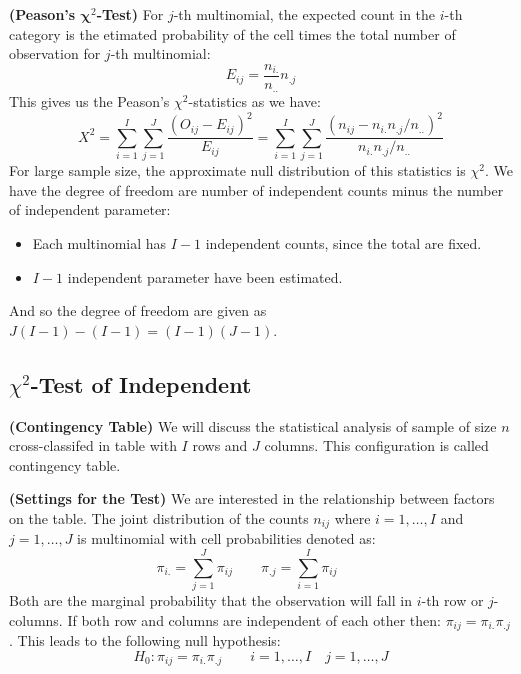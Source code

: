 \begin{definition}{\textbf{(Peason's $\boldsymbol \chi^2$-Test)}}
    For $j$-th multinomial, the expected count in the $i$-th category is the etimated probability of the cell times the total number of observation for $j$-th multinomial:
    \begin{equation*}
        E_{ij} = \frac{n_{i.}}{n_{..}} n_{.j}
    \end{equation*}
    This gives us the Peason's $\chi^2$-statistics as we have:
    \begin{equation*}
        X^2 = \sum^I_{i=1}\sum^J_{j=1} \frac{(O_{ij} - E_{ij})^2}{E_{ij}} =  \sum^I_{i=1}\sum^J_{j=1} \frac{(n_{ij} - n_{i.}n_{.j}/n_{..})^2}{n_{i.}n_{.j}/n_{..}}
    \end{equation*}
    For large sample size, the approximate null distribution of this statistics is $\chi^2$. We have the degree of freedom are number of independent counts minus the number of independent parameter:
    \begin{itemize}
        \item Each multinomial has $I-1$ independent counts, since the total are fixed. 
        \item $I-1$ independent parameter have been estimated.
    \end{itemize}
    And so the degree of freedom are given as $J(I-1)-(I-1) = (I-1)(J-1)$. 
\end{definition}

\subsection{$\chi^2$-Test of Independent}

\begin{definition}{\textbf{(Contingency Table)}}
    We will discuss the statistical analysis of sample of size $n$ cross-classifed in table with $I$ rows and $J$ columns. This configuration is called contingency table.
\end{definition}

\begin{remark}{\textbf{(Settings for the Test)}}
    We are interested in the relationship between factors on the table. The joint distribution of the counts $n_{ij}$ where $i=1,\dots,I$ and $j=1,\dots,J$ is multinomial with cell probabilities denoted as:
    \begin{equation*}
        \pi_{i.} = \sum^J_{j=1}\pi_{ij} \qquad
        \pi_{.j} = \sum^I_{i=1}\pi_{ij} \qquad
    \end{equation*}
    Both are the marginal probability that the observation will fall in $i$-th row or $j$-columns. If both row and columns are independent of each other then: $\pi_{ij} = \pi_{i.}\pi_{.j}$. This leads to the following null hypothesis:
    \begin{equation*}
        H_0 : \pi_{ij} = \pi_{i.}\pi_{.j} \qquad i = 1,\dots,I \quad j = 1,\dots,J
    \end{equation*}
\end{remark}


